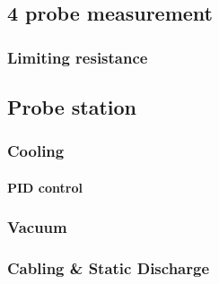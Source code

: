 \documentclass[../chap2_techniques.tex]{subfiles}
\begin{document}
	
	\subsection{4 probe measurement}
	\subsubsection{Limiting resistance}
	
	\subsection{Probe station}
	\subsubsection{Cooling}
	\paragraph{PID control}
	\subsubsection{Vacuum}
	\subsubsection{Cabling \& Static Discharge}
	
\end{document}
